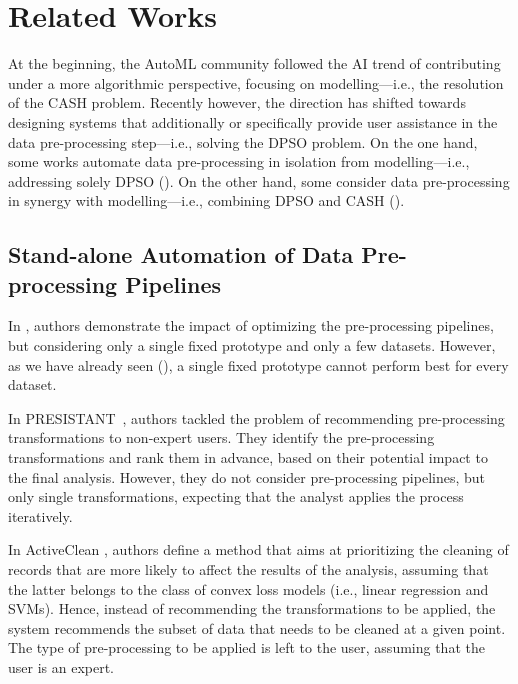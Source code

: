 \section{Related Works}
\label{effective-sec:related-work}
At the beginning, the AutoML community followed the AI trend of contributing under a more algorithmic perspective, focusing on modelling---i.e., the resolution of the CASH problem.
Recently however, the direction has shifted towards designing systems that additionally or specifically provide user assistance in the data pre-processing step---i.e., solving the DPSO problem.
On the one hand, some works automate data pre-processing in isolation from modelling---i.e., addressing solely DPSO ().
On the other hand, some consider data pre-processing in synergy with modelling---i.e., combining DPSO and CASH ().

\subsection{Stand-alone Automation of Data Pre-processing Pipelines}
\label{effective-ssec:dpso}

In \cite{Quemy20InfSystems}, authors demonstrate the impact of optimizing the pre-processing pipelines, but considering only a single fixed prototype and only a few datasets.
However, as we have already seen (), a single fixed prototype cannot perform best for every dataset.

In PRESISTANT~\cite{presistant18CSI,presistant18CAISE,presistant19DKE}, authors tackled the problem of recommending pre-processing transformations to non-expert users.
They identify the pre-processing transformations and rank them in advance, based on their potential impact to the final analysis.
However, they do not consider pre-processing pipelines, but only single transformations, expecting that the analyst applies the process iteratively.

In ActiveClean \cite{ActiveClean16PVLDB}, authors define a method that aims at prioritizing the cleaning of records that are more likely to affect the results of the analysis, assuming that the latter belongs to the class of convex loss models (i.e., linear regression and SVMs).
Hence, instead of recommending the transformations to be applied, the system recommends the subset of data that needs to be cleaned at a given point.
The type of pre-processing to be applied is left to the user, assuming that the user is an expert.

